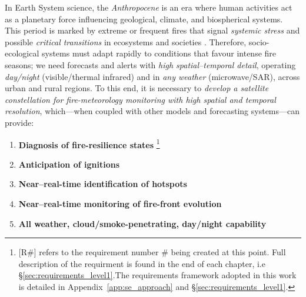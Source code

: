 In Earth System science, the \emph{Anthropocene} is an era where human activities act as a planetary force influencing geological, climate, and biospherical systems. This period is marked by extreme or
frequent fires that signal \emph{systemic stress} and possible \emph{critical transitions} in ecosystems and societies
\cite{bowman2020fires,scheffer2009early}. Therefore, socio-ecological
systems must adapt rapidly to conditions that favour intense fire seasons; we
need forecasts and alerts with \emph{high spatial--temporal detail},
operating \emph{day/night} (visible/thermal infrared) and in \emph{any weather}
(microwave/SAR), across urban and rural regions. To this end, it is necessary
to \emph{develop a satellite constellation for fire-meteorology monitoring
with high spatial and temporal resolution}, which---when coupled with other
models and forecasting systems---can provide:
\begin{enumerate}\setlength{\itemsep}{0pt}\setlength{\parskip}{0pt}\setlength{\parsep}{0pt}
\item \textbf{Diagnosis of fire-resilience states }\footnote{[\rightarrow R\#] refers to the requirement number \# being created at this point. Full description of the requirment is found in the end of each chapter, i.e \S \ref{sec:requirements_level1}.The requirements framework adopted in this work is detailed in Appendix~\ref{app:se_approach} and \S\ref{sec:requirements_level1}.}
\item \textbf{Anticipation of ignitions }
\item \textbf{Near--real-time identification of hotspots }
\item \textbf{Near--real-time monitoring of fire-front evolution }
\item \textbf{All weather, cloud/smoke-penetrating, day/night capability }
\end{enumerate}


